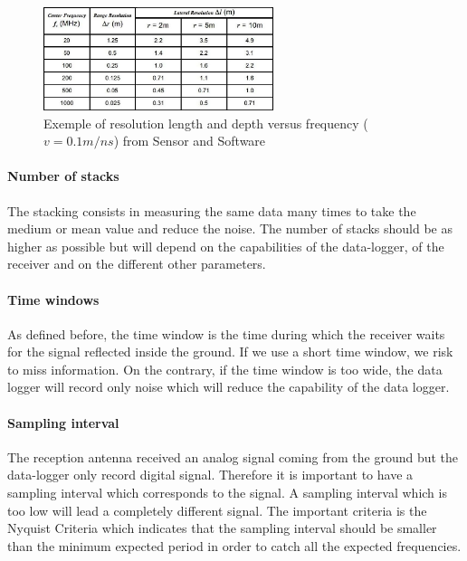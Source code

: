\begin{figure}[h]
    \centering
    \includegraphics[width=0.6\textwidth]{Images/00_Theory/SS_FrequencyDepthResolution.jpg}
    \caption{Exemple of resolution length and depth versus frequency ($v=0.1m/ns$) from Sensor and Software \cite{UnderstandingDetection}}
    \label{fig:GPRFrequency}
\end{figure}

\paragraph{Number of stacks} The stacking consists in measuring the same data many times to take the medium or mean value and reduce the noise. The number of stacks should be as higher as possible but will depend on the capabilities of the data-logger, of the receiver and on the different other parameters.


\paragraph{Time windows} As defined before, the time window is the time during which the receiver waits for the signal reflected inside the ground. If we use a short time window, we risk to miss information. On the contrary, if the time window is too wide, the data logger will record only noise which will reduce the capability of the data logger.

\paragraph{Sampling interval} The reception antenna received an analog signal coming from the ground but the data-logger only record digital signal. Therefore it is important to have a sampling interval which corresponds to the signal. A sampling interval which is too low will lead a completely different signal. The important criteria is the Nyquist Criteria which indicates that the sampling interval should be smaller than the minimum expected period in order to catch all the expected frequencies.

